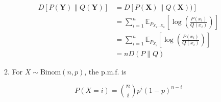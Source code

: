 \documentclass[a4paper]{article}
\begin{document}
\begin{enumerate}
\begin{enumerate}
      \begin{equation}
        \begin{aligned}
          D\left[P(\boldsymbol{Y}) \| Q(\boldsymbol{Y})\right] &= D\left[P( \boldsymbol{X} )\| Q(\boldsymbol{X} ) )\right] \\
          & = \sum_{i=1}^n \mathbb{E}_{P_{X_{1} \ldots X_{n}}} \left[\log \left(\frac{ P\left(x_{i}\right)}{ Q\left(x_{i}\right)}\right)\right] \\
          & = \sum_{i=1}^n \mathbb{E}_{P_{X_{i}}} \left[\log \left(\frac{ P\left(x_{i}\right)}{ Q\left(x_{i}\right)}\right)\right] \\ 
          & = nD(P \| Q)
        \end{aligned}
      \end{equation}

      



       \item For $X\sim \text{Binom}(n,p)$, the p.m.f. is 
       
       \begin{equation}
         P(X=i) = \binom{n}{i}p^i (1-p)^{n-i}
       \end{equation}


\end{enumerate}
\end{enumerate}
\end{document}
